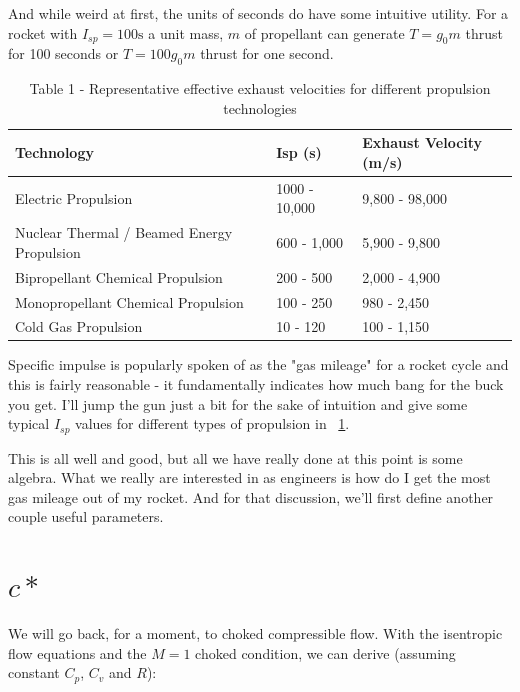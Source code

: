 \documentclass[twocolumn]{memoir} %
\begin{document}
And while weird at first, the units of seconds do have some intuitive
utility. For a rocket with $I_{sp} = 100 \text{s}$ a unit mass, $m$
of propellant can generate $T=g_0 m$ thrust for 100 seconds or
$T = 100 g_0 m$ thrust for one second.

\begin{table}[h]
    \centering
    \begin{tabular}{lll}
    \toprule
    Technology                    & Isp (s)        & Exhaust Velocity (m/s)  \\
    \midrule
    Electric Propulsion           & 1000 - 10,000  & 9,800 - 98,000  \\
    Nuclear Thermal / Beamed Energy Propulsion & 600 - 1,000  & 5,900 - 9,800  \\
    Bipropellant Chemical Propulsion           & 200 - 500    & 2,000 - 4,900  \\
    Monopropellant Chemical Propulsion         & 100 - 250    & 980 - 2,450  \\
    Cold Gas Propulsion                        & 10 - 120     & 100 - 1,150  \\
    \bottomrule
    \end{tabular}
\caption{Table 1 - Representative effective exhaust velocities for different propulsion technologies}
\label{t:tech_c}
\end{table}

Specific impulse is popularly spoken of as the "gas mileage" for a
rocket cycle and this is fairly reasonable - it fundamentally indicates
how much bang for the buck you get. I'll jump the gun just a bit for the
sake of intuition and give some typical $I_{sp}$ values for different
types of propulsion in ~\cref{t:tech_c}.

This is all well and good, but all we have really done at this point is
some algebra. What we really are interested in as engineers is how do I
get the most gas mileage out of my rocket. And for that discussion,
we'll first define another couple useful parameters.

\section{$c*$}\label{c}

We will go back, for a moment, to choked compressible flow. With the
isentropic flow equations and the $M=1$ choked condition, we can
derive (assuming constant $C_p$, $C_v$ and $R$):
\end{document}
